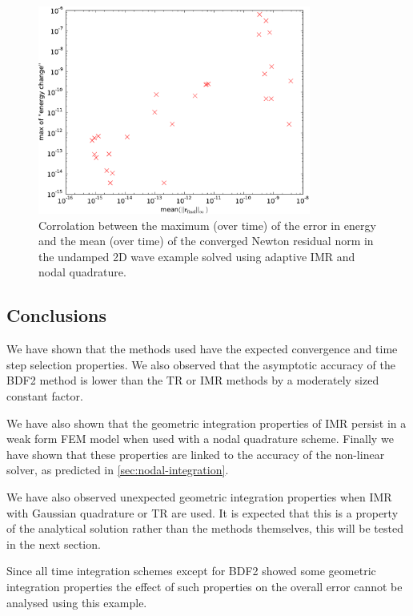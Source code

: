 \begin{figure}
  \centering
  \includegraphics[width=0.8\textwidth]
  {plots/2d_wave_solution_energy_newton_res/maxofenergychangevsmeanminofnewtonresiduals.pdf}
  \caption{Corrolation between the maximum (over time) of the error in energy and the mean (over time) of the converged Newton residual norm in the undamped 2D wave example solved using adaptive IMR and nodal quadrature.}
  \label{fig:energy-error-2d-nodal-newton-tests}
\end{figure}



\subsection{Conclusions}

We have shown that the methods used have the expected convergence and time step selection properties.
We also observed that the asymptotic accuracy of the BDF2 method is lower than the TR or IMR methods by a moderately sized constant factor.

We have also shown that the geometric integration properties of IMR persist in a weak form FEM model when used with a nodal quadrature scheme.
Finally we have shown that these properties are linked to the accuracy of the non-linear solver, as predicted in \cref{sec:nodal-integration}.

We have also observed unexpected geometric integration properties when IMR with Gaussian quadrature or TR are used.
It is expected that this is a property of the analytical solution rather than the methods themselves, this will be tested in the next section.

Since all time integration schemes except for BDF2 showed some geometric integration properties the effect of such properties on the overall error cannot be analysed using this example.


